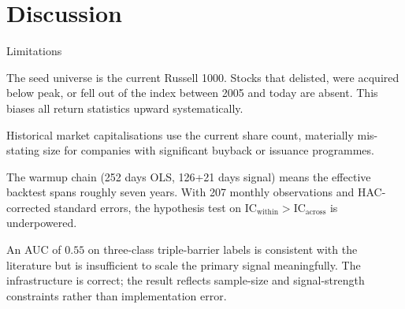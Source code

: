 \documentclass[10pt,aspectratio=169]{beamer}
\begin{document}
\section{Discussion}

\begin{frame}{Limitations}
  \small
  \begin{description}\setlength{\itemsep}{4pt}
    \item[Survivorship bias.] The seed universe is the current Russell 1000. Stocks that delisted, were acquired below peak, or fell out of the index between 2005 and today are absent. This biases all return statistics upward systematically.

    \item[Static share count.] Historical market capitalisations use the current share count, materially mis-stating size for companies with significant buyback or issuance programmes.

    \item[Short effective sample.] The warmup chain (252 days OLS, 126+21 days signal) means the effective backtest spans roughly seven years. With 207 monthly observations and HAC-corrected standard errors, the hypothesis test on $\mathrm{IC}_{\text{within}} > \mathrm{IC}_{\text{across}}$ is underpowered.

    \item[ML discrimination.] An AUC of $0.55$ on three-class triple-barrier labels is consistent with the literature \cite{lopezdeprado2018, devarakonda2023} but is insufficient to scale the primary signal meaningfully. The infrastructure is correct; the result reflects sample-size and signal-strength constraints rather than implementation error.
  \end{description}
\end{frame}
\end{document}
